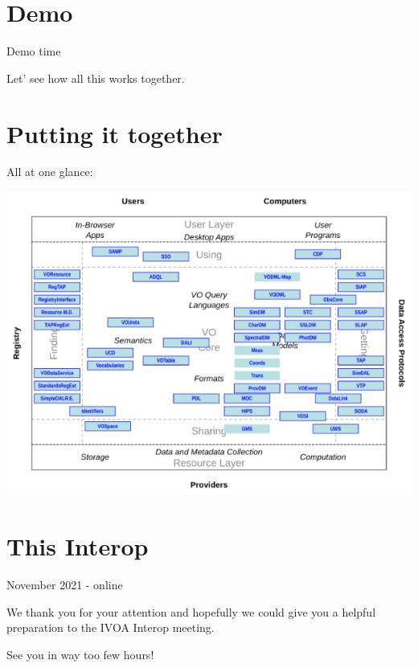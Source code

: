 \documentclass{beamer}
\begin{document}
\section{Demo}

\begin{frame}{Demo time}

Let' see how all this works together.

\end{frame}



\section{Putting it together}

\begin{frame}{All at one glance:}

\includegraphics[width=\linewidth]{archdiag2.png}
\end{frame}


\section{This Interop}

\begin{frame}{November 2021 - online}

We thank you for your attention and hopefully we could give you a
helpful preparation to the IVOA Interop meeting. 

See you in way too few hours! 

\end{frame} 
\end{document}
